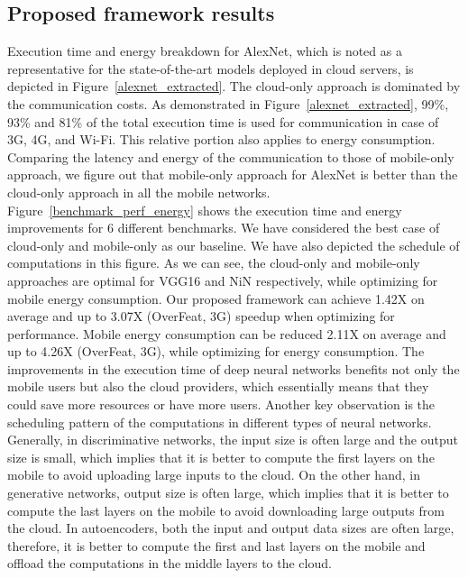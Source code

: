 \documentclass[conference,9pt]{IEEEtran}
\begin{document}
\subsection{Proposed framework results}
Execution time and energy breakdown for AlexNet, which is noted as a representative for the state-of-the-art models deployed in cloud servers\cite{b27}, is depicted in Figure~\ref{alexnet_extracted}. The cloud-only approach is dominated by the communication costs. As demonstrated in Figure~\ref{alexnet_extracted}, 99\%, 93\% and 81\% of the total execution time is used for communication in case of 3G, 4G, and Wi-Fi. This relative portion also applies to energy consumption. Comparing the latency and energy of the communication to those of mobile-only approach, we figure out that mobile-only approach for AlexNet is better than the cloud-only approach in all the mobile networks.\\

Figure~\ref{benchmark_perf_energy} shows the execution time and energy improvements for 6 different benchmarks. We have considered the best case of cloud-only and mobile-only as our baseline. We have also depicted the schedule of computations in this figure. As we can see, the cloud-only and mobile-only approaches are optimal for VGG16 and NiN respectively, while optimizing for mobile energy consumption. Our proposed framework can achieve 1.42X on average and up to 3.07X (OverFeat, 3G) speedup when optimizing for performance. Mobile energy consumption can be reduced 2.11X on average and up to 4.26X (OverFeat, 3G), while optimizing for energy consumption. The improvements in the execution time of deep neural networks benefits not only the mobile users but also the cloud providers, which essentially means that they could save more resources or have more users. Another key observation is the scheduling pattern of the computations in different types of neural networks. Generally, in discriminative networks, the input size is often large and the output size is small, which implies that it is better to compute the first layers on the mobile to avoid uploading large inputs to the cloud. On the other hand, in generative networks, output size is often large, which implies that it is better to compute the last layers on the mobile to avoid downloading large outputs from the cloud. In autoencoders, both the input and output data sizes are often large, therefore, it is better to compute the first and last layers on the mobile and offload the computations in the middle layers to the cloud.
\end{document}
